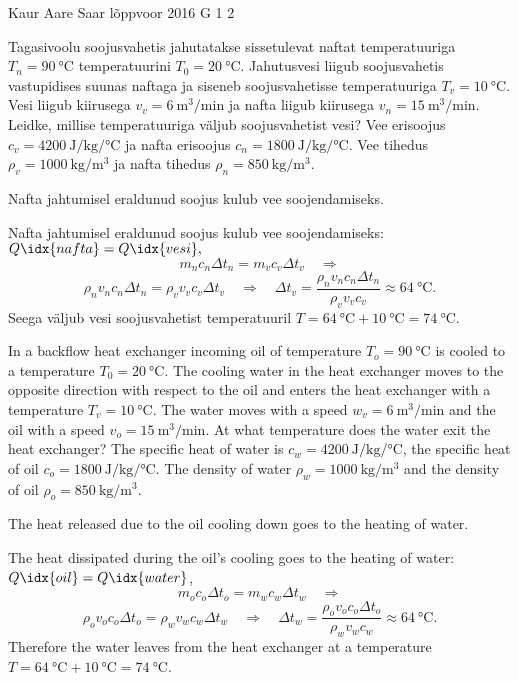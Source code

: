 {Kaur Aare Saar} %
{lõppvoor} %
{2016} %
{G 1} %
{2} %
{
\ifStatement
Tagasivoolu soojusvahetis jahutatakse sissetulevat naftat temperatuuriga $T_{n}=\SI{90}{\celsius}$ temperatuurini $T_{0}=\SI{20}{\celsius}$. 
Jahutusvesi liigub soojusvahetis vastupidises suunas naftaga ja siseneb soojusvahetisse temperatuuriga $T_{v}=\SI{10}{\celsius}$.
Vesi liigub kiirusega $v_{v}=\SI{6}{\m^3\per\minute}$ 
ja nafta liigub kiirusega $v_{n}=\SI{15}{\m^3\per\minute}$. 
Leidke, millise temperatuuriga väljub soojusvahetist vesi? Vee erisoojus $c_{v}=\SI{4200}{\joule\per\kilogram\per\celsius}$ 
ja nafta erisoojus $c_{n}=\SI{1800}{\joule\per\kilogram\per\celsius}$. Vee tihedus $\rho_{v}=\SI{1000}{\kilogram\per\metre\cubed}$ ja nafta tihedus $\rho_{n}=\SI{850}{\kilogram\per\metre\cubed}$.
\fi


\ifHint
Nafta jahtumisel eraldunud soojus kulub vee soojendamiseks.
\fi


\ifSolution
Nafta jahtumisel eraldunud soojus kulub vee soojendamiseks: $Q\idx{nafta} = Q\idx{vesi},$
\[ m_nc_n\Delta t_n = m_vc_v\Delta t_v \quad\Rightarrow \]
\[ \rho_nv_nc_n\Delta t_n = \rho_v v_vc_v\Delta t_v \quad\Rightarrow\quad \Delta t_v = \frac{\rho_nv_nc_n\Delta t_n}{\rho_vv_vc_v} \approx \SI{64}{\celsius}.  \]
Seega väljub vesi soojusvahetist temperatuuril $T = \SI{64}{\celsius} + \SI{10}{\celsius} = \SI{74}{\celsius}$.
\fi


\ifEngStatement
In a backflow heat exchanger incoming oil of temperature $T_{o}=\SI{90}{\celsius}$ is cooled to a temperature $T_{0}=\SI{20}{\celsius}$. The cooling water in the heat exchanger moves to the opposite direction with respect to the oil and enters the heat exchanger with a temperature $T_{v}=\SI{10}{\celsius}$. The water moves with a speed $w_{v}=\SI{6}{\m^3\per\minute}$ and the oil with a speed $v_{o}=\SI{15}{\m^3\per\minute}$. At what temperature does the water exit the heat exchanger? The specific heat of water is $c_{w}=\SI{4200}{\joule\per\kilogram\per\celsius}$, the specific heat of oil $c_{o}=\SI{1800}{\joule\per\kilogram\per\celsius}$. The density of water $\rho_{w}=\SI{1000}{\kilogram\per\metre\cubed}$ and the density of oil $\rho_{o}=\SI{850}{\kilogram\per\metre\cubed}$.
\fi


\ifEngHint
The heat released due to the oil cooling down goes to the heating of water.
\fi


\ifEngSolution
The heat dissipated during the oil's cooling goes to the heating of water: $Q\idx{oil} = Q\idx{water}$,
\[ m_oc_o\Delta t_o = m_wc_w\Delta t_w \quad\Rightarrow \]
\[ \rho_ov_oc_o\Delta t_o = \rho_w v_wc_w\Delta t_w \quad\Rightarrow\quad \Delta t_w = \frac{\rho_ov_oc_o\Delta t_o}{\rho_wv_wc_w} \approx \SI{64}{\celsius}.  \]
Therefore the water leaves from the heat exchanger at a temperature $T = \SI{64}{\celsius} + \SI{10}{\celsius} = \SI{74}{\celsius}$.
\fi
}
